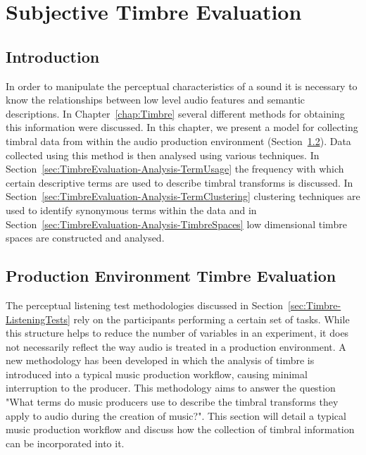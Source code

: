 \chapter{Subjective Timbre Evaluation}
\label{chap:TimbreEvaluation}

\section{Introduction}
\label{sec:TimbreEvaluation-Introduction}
	In order to manipulate the perceptual characteristics of a sound it is necessary to know the relationships between
	low level audio features and semantic descriptions. In Chapter~\ref{chap:Timbre} several different methods for
	obtaining this information were discussed. In this chapter, we present a model for collecting timbral data from
	within the audio production environment (Section~\ref{sec:TimbreEvaluation-DAWBasedTimbreEvaluation}). Data
	collected using this method is then analysed using various techniques. In
	Section~\ref{sec:TimbreEvaluation-Analysis-TermUsage} the frequency with which certain descriptive terms are used
	to describe timbral transforms is discussed. In Section~\ref{sec:TimbreEvaluation-Analysis-TermClustering}
	clustering techniques are used to identify synonymous terms within the data and in
	Section~\ref{sec:TimbreEvaluation-Analysis-TimbreSpaces} low dimensional timbre spaces are constructed and
	analysed.

\section{Production Environment Timbre Evaluation} %
\label{sec:TimbreEvaluation-DAWBasedTimbreEvaluation}
	The perceptual listening test methodologies discussed in Section~\ref{sec:Timbre-ListeningTests} rely on the
	participants performing a certain set of tasks. While this structure helps to reduce the number of variables in an
	experiment, it does not necessarily reflect the way audio is treated in a production environment. A new methodology
	has been developed in which the analysis of timbre is introduced into a typical music production workflow, causing
	minimal interruption to the producer. This methodology aims to answer the question "What terms do music producers
	use to describe the timbral transforms they apply to audio during the creation of music?". This section will
	detail a typical music production workflow and discuss how the collection of timbral information can be
	incorporated into it.

